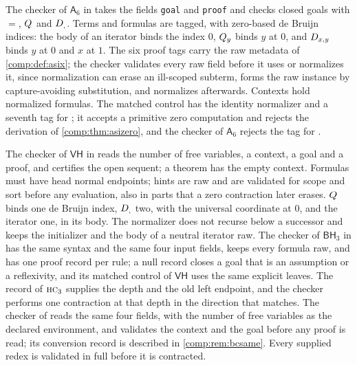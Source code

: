 The checker of $\mathsf{A}_6$ in  takes the
fields \texttt{goal} and \texttt{proof} and checks closed goals with $=$,
$Q_{}$ and $D_{,}$. Terms and formulas are tagged, with zero-based
de Bruijn indices: the body of an iterator binds the index $0$, $Q_{y}$ binds
$y$ at $0$, and $D_{x,y}$ binds $y$ at $0$ and $x$ at $1$. The six proof
tags carry the raw metadata of \cref{comp:def:asix}; the checker validates
every raw field before it uses or normalizes it, since normalization can
erase an ill-scoped subterm, forms the raw instance by capture-avoiding
substitution, and normalizes afterwards. Contexts hold normalized formulas.
The matched control has the identity normalizer and a seventh tag for
; it accepts a primitive zero computation and rejects the
derivation of \cref{comp:thm:asizero}, and the checker of $\mathsf{A}_6$
rejects the tag for .

The checker of $\mathsf{VH}$ in  reads the number of
free variables, a context, a goal and a proof, and certifies the open
sequent; a theorem has the empty context. Formulas must have head normal
endpoints; hints are raw and are validated for scope and sort before any
evaluation, also in parts that a zero contraction later erases. $Q_{}$ binds
one de Bruijn index, $D_{,}$ two, with the universal coordinate at $0$, and
the iterator one, in its body. The normalizer does not recurse below a
successor and keeps the initializer and the body of a neutral iterator
raw. The checker of $\mathsf{BH}_3$ in  has the same
syntax and the same four input fields, keeps every formula raw, and has
one proof record per rule; a null record closes a goal that is an
assumption or a reflexivity, and its matched control of $\mathsf{VH}$ uses
the same explicit leaves. The record of $\rulename{HC}_3$ supplies the depth
and the old left endpoint, and the checker performs one contraction at that
depth in the direction that matches. The checker of 
reads the same four fields, with the number of free variables as the
declared environment, and validates the context and the goal before any
proof is read; its conversion record is described in \cref{comp:rem:bcsame}.
Every supplied redex is validated in full before it is contracted.

